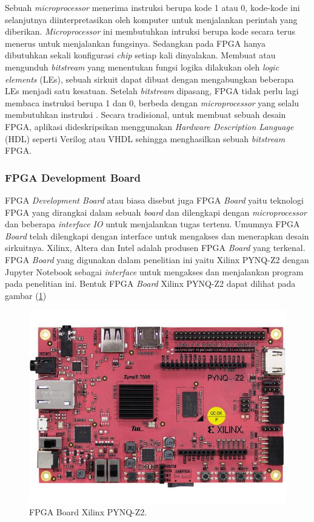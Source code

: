Sebuah \textit{microprocessor} menerima instruksi berupa kode 1 atau 0, kode-kode ini selanjutnya diinterpretasikan oleh komputer untuk menjalankan perintah yang diberikan. \textit{Microprocessor} ini membutuhkan intruksi berupa kode secara terus menerus untuk menjalankan fungsinya. Sedangkan pada FPGA hanya dibutuhkan sekali konfigurasi \textit{chip} setiap kali dinyalakan. Membuat atau mengunduh \textit{bitstream} yang menentukan fungsi logika dilakukan oleh \textit{logic elements} (LEs), sebuah sirkuit dapat dibuat dengan mengabungkan beberapa LEs menjadi satu kesatuan. Setelah \textit{bitstream} dipasang, FPGA tidak perlu lagi membaca instruksi berupa 1 dan 0, berbeda dengan \textit{microprocessor} yang selalu membutuhkan instruksi \cite{pdf:cheung}. Secara tradisional, untuk membuat sebuah desain FPGA, aplikasi dideskripsikan menggunakan \textit{Hardware Description Language} (HDL) seperti Verilog atau VHDL sehingga menghasilkan sebuah \textit{bitstream} FPGA. 

\subsubsection{FPGA Development Board}
FPGA \textit{Development Board} atau biasa disebut juga FPGA \textit{Board} yaitu teknologi FPGA yang dirangkai dalam sebuah \textit{board} dan dilengkapi dengan \textit{microprocessor} dan beberapa \textit{interface} \textit{IO} untuk menjalankan tugas tertenu. Umumnya FPGA \textit{Board} telah dilengkapi dengan interface untuk mengakses dan menerapkan desain sirkuitnya. Xilinx, Altera dan Intel adalah produsen FPGA \textit{Board} yang terkenal. FPGA \textit{Board} yang digunakan dalam penelitian ini yaitu Xilinx PYNQ-Z2 dengan Jupyter Notebook sebagai \textit{interface} untuk mengakses dan menjalankan program pada penelitian ini. Bentuk FPGA \textit{Board} Xilinx PYNQ-Z2 dapat dilihat pada gambar (\ref{fig:pynq-z2})

\begin{figure}[ht]
    \includegraphics[width=0.8\linewidth, center]{images/pynq-z2.jpeg}
    \caption{FPGA Board Xilinx PYNQ-Z2.}
    \label{fig:pynq-z2}
\end{figure}

